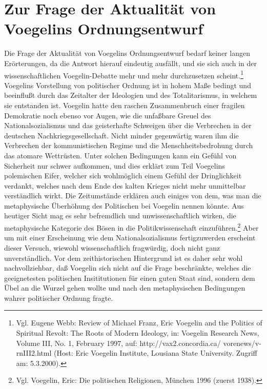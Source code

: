 \section{Zur Frage der Aktualität von Voegelins Ordnungsentwurf}

Die Frage der Aktualität von Voegelins Ordnungsentwurf bedarf keiner
langen Erörterungen, da die Antwort hierauf eindeutig ausfällt, und sie
sich auch in der wissenschaftlichen Voegelin-Debatte mehr und mehr
durchzusetzen scheint.\footnote{Vgl. Eugene Webb: Review of Michael
  Franz, Eric Voegelin and the Politics of Spiritual Revolt: The Roots
  of Modern Ideology, in: Voegelin Research News, Volume III, No. 1,
  February 1997, auf: http://vax2.concordia.ca/\~{
    }vorenews/v-rnIII2.html (Host: Eric Voegelin Institute, Lousiana
  State University. Zugriff am: 5.3.2000).} Voegelins Vorstellung von
politischer Ordnung ist in hohem Maße bedingt und beeinflußt durch das
Zeitalter der Ideologien und des Totalitarismus, in welchem sie
entstanden ist. Voegelin hatte den raschen Zusammenbruch einer fragilen
Demokratie noch ebenso vor Augen, wie die unfaßbare Greuel des
Nationalsozialismus und das geisterhafte Schweigen über die Verbrechen
in der deutschen Nachkriegsgesellschaft. Nicht minder gegenwärtig waren
ihm die Verbrechen der kommunistischen Regime und die
Menschheitsbedrohung durch das atomare Wettrüsten. Unter solchen
Bedingungen kann ein Gefühl von Sicherheit nur schwer aufkommen, und
dies erklärt zum Teil Voegelins polemischen Eifer, welcher sich
wohlmöglich einem Gefühl der Dringlichkeit verdankt, welches nach dem
Ende des kalten Krieges nicht mehr unmittelbar verständlich wirkt. Die
Zeitumstände erklären auch einiges von dem, was man die metaphysische
Überhöhung des Politischen bei Voegelin nennen könnte. Aus heutiger
Sicht mag es sehr befremdlich und unwissenschaftlich wirken, die
metaphysische Kategorie des Bösen in die Politikwissenschaft
einzuführen.\footnote{Vgl. Voegelin, Eric: Die politischen Religionen,
  München 1996 (zuerst 1938).} Aber um mit einer Erscheinung wie dem
Nationalsozialismus fertigzuwerden erscheint dieser Versuch, wiewohl
wissenschaftlich fragwürdig, doch nicht ganz unverständlich. Vor dem
zeithistorischen Hintergrund ist es daher sehr wohl nachvollziehbar, daß
Voegelin sich nicht auf die Frage beschränkte, welches die geeignetesten
politischen Insititutionen für einen guten Staat sind, sondern dem Übel
an die Wurzel gehen wollte und nach den metaphysischen Bedingungen
wahrer politischer Ordnung fragte.

